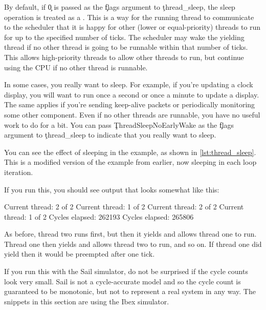 By default, if \c{0} is passed as the \c{flags} argument to \c{thread_sleep}, the sleep operation is treated as a .
This is a way for the running thread to communicate to the scheduler that it is happy for other (lower or equal-priority) threads to run for up to the specified number of ticks.
The scheduler may wake the yielding thread if no other thread is going to be runnable within that number of ticks.
This allows high-priority threads to allow other threads to run, but continue using the CPU if no other thread is runnable.

In some cases, you really want to sleep.
For example, if you're updating a clock display, you will want to run once a second or once a minute to update a display.
The same applies if you're sending keep-alive packets or periodically monitoring some other component.
Even if no other threads are runnable, you have no useful work to do for a bit.
You can pass \c{ThreadSleepNoEarlyWake} as the \c{flags} argument to \c{thread_sleep} to indicate that you really want to sleep.

You can see the effect of sleeping in the  example, as shown in \ref{lst:thread_sleep}.
This is a modified version of the  example from earlier, now sleeping in each loop iteration.

\codelisting[filename=examples/thread_sleep/current.cc,marker=entry,label=lst:thread_sleep,caption="A simple example of thread sleeping"]{}

If you run this, you should see output that looks somewhat like this:

\begin{console}
Current thread: 2 of 2
Current thread: 1 of 2
Current thread: 2 of 2
Current thread: 1 of 2
Cycles elapsed: 262193
Cycles elapsed: 265806
\end{console}

As before, thread two runs first, but then it yields and allows thread one to run.
Thread one then yields and allows thread two to run, and so on.
If thread one did  yield then it would be preempted after one tick.

\begin{note}
If you run this with the Sail simulator, do not be surprised if the cycle counts look very small.
Sail is not a cycle-accurate model and so the cycle count is guaranteed to be monotonic, but not to represent a real system in any way.
The snippets in this section are using the Ibex simulator.
\end{note}


